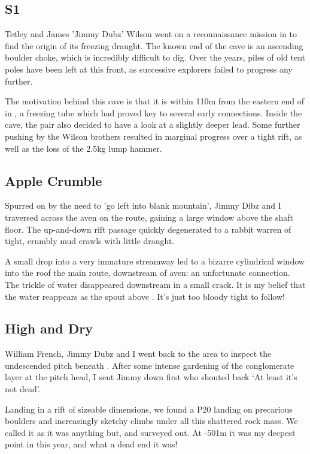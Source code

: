 \subsection{S1} Tetley and James 'Jimmy Dubz' Wilson went on a reconnaissance mission in  to find the origin of its freezing draught. The known end of the cave is an ascending boulder choke, which is incredibly difficult to dig. Over the years, piles of old tent poles have been left at this front, as successive explorers failed to progress any further. 

The motivation behind this cave is that it is within 110m from the eastern end of  in , a freezing tube which had proved key to several early connections. Inside the cave, the pair also decided to have a look at a slightly deeper lead. Some further pushing by the Wilson brothers resulted in marginal progress over a tight rift, as well as the loss of the 2.5kg lump hammer. 

\subsection{Apple Crumble} Spurred on by the need to 'go left into blank mountain', Jimmy Dibz and I  traversed across the  aven on the  route, gaining a large window above the shaft floor. The up-and-down rift passage quickly degenerated to a rabbit warren of tight, crumbly mud crawls with little draught. 

A small drop into a very immature streamway led to a bizarre cylindrical window into the roof the main  route, downstream of  aven: an unfortunate connection. The trickle of water disappeared downstream in a small crack. It is my belief that the water reappears as the spout above . It's just too bloody tight to follow! 

\subsection{High and Dry} William French, Jimmy Dubz and I went back to the  area to inspect the undescended pitch beneath . After some intense gardening of the conglomerate layer at the pitch head, I sent Jimmy down first who shouted back `At least it's not dead'. 

Landing in a rift of sizeable dimensions, we found a P20 landing on precarious boulders and increasingly sketchy climbs under all this shattered rock mass. We called it  as it was anything but, and surveyed out. At -501m it was my deepest point in  this year, and what a dead end it was! 

